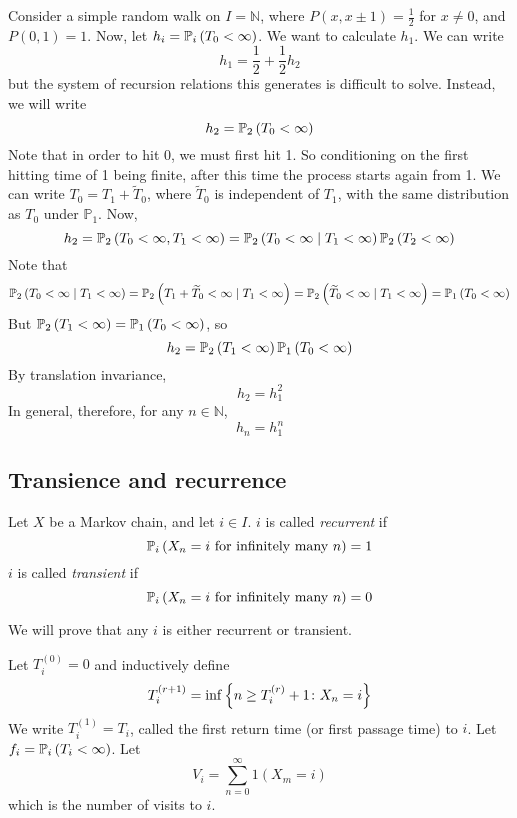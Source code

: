 \begin{example}
	Consider a simple random walk on \( I = \mathbb N \), where \( P(x,x\pm 1) = \frac{1}{2} \) for \( x \neq 0 \), and \( P(0,1) = 1 \).
	Now, let \( h_i = \mathbb{P}_{i}\left({T_0 < \infty}\right) \).
	We want to calculate \( h_1 \).
	We can write
	\[
		h_1 = \frac{1}{2} + \frac{1}{2} h_2
	\]
	but the system of recursion relations this generates is difficult to solve.
	Instead, we will write
	\[
		h_2 = \mathbb{P}_{2}\left({T_0 < \infty}\right)
	\]
	Note that in order to hit 0, we must first hit 1.
	So conditioning on the first hitting time of 1 being finite, after this time the process starts again from 1.
	We can write \( T_0 = T_1 + \widetilde T_0 \), where \( \widetilde T_0 \) is independent of \( T_1 \), with the same distribution as \( T_0 \) under \( \mathbb P_1 \).
	Now,
	\[
		h_2 = \mathbb{P}_{2}\left({T_0 < \infty, T_1 < \infty}\right) = \mathbb{P}_{2}\left({T_0 < \infty \mid T_1 < \infty}\right) \mathbb{P}_{2}\left({T_2 < \infty}\right)
	\]
	Note that
	\[
		\mathbb{P}_{2}\left({T_0 < \infty \mid T_1 < \infty}\right) = \mathbb{P}_{2}\left({T_1 + \widetilde T_0 < \infty \mid T_1 < \infty}\right) = \mathbb{P}_{2}\left({\widetilde T_0 < \infty \mid T_1 < \infty}\right) = \mathbb{P}_{1}\left({T_0 < \infty}\right)
	\]
	But \( \mathbb{P}_{2}\left({T_1 < \infty}\right) = \mathbb{P}_{1}\left({T_0 < \infty}\right) \), so
	\[
		h_2 = \mathbb{P}_{2}\left({T_1 < \infty}\right) \mathbb{P}_{1}\left({T_0 < \infty}\right)
	\]
	By translation invariance,
	\[
		h_2 = h_1^2
	\]
	In general, therefore, for any \( n \in \mathbb N \),
	\[
		h_n = h_1^n
	\]
\end{example}

\subsection{Transience and recurrence}
\begin{definition}
	Let \( X \) be a Markov chain, and let \( i \in I \).
	\( i \) is called \textit{recurrent} if
	\[
		\mathbb{P}_{i}\left({X_n = i \text{ for infinitely many } n}\right) = 1
	\]
	\( i \) is called \textit{transient} if
	\[
		\mathbb{P}_{i}\left({X_n = i \text{ for infinitely many } n}\right) = 0
	\]
\end{definition}
\noindent We will prove that any \( i \) is either recurrent or transient.
\begin{definition}
	Let \( T_i^{(0)} = 0 \) and inductively define
	\[
		T_i^{(r+1)} = \inf \qty{n \geq T_i^{(r)} + 1 \colon X_n = i}
	\]
	We write \( T_i^{(1)} = T_i \), called the first return time (or first passage time) to \( i \).
	Let \( f_i = \mathbb{P}_{i}\left({T_i < \infty}\right) \).
	Let
	\[
		V_i = \sum_{n=0}^\infty 1(X_m = i)
	\]
	which is the number of visits to \( i \).
\end{definition}
